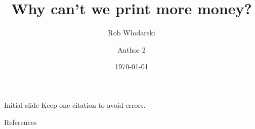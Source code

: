 \documentclass[aspectratio=169,t,10pt,table]{beamer}
\title{Why can't we print more money?}
\date{\today}
\author{Rob Włodarski \and Author 2}
\begin{document}
\begin{frame}
\maketitle

\end{frame}

\begin{frame}{Initial slide}
  Keep one citation to avoid errors.
  \newline
\end{frame}






\begin{frame}{References}
  \thispagestyle{empty}
  \printbibliography
\end{frame}
\appendix

% 
\end{document}
